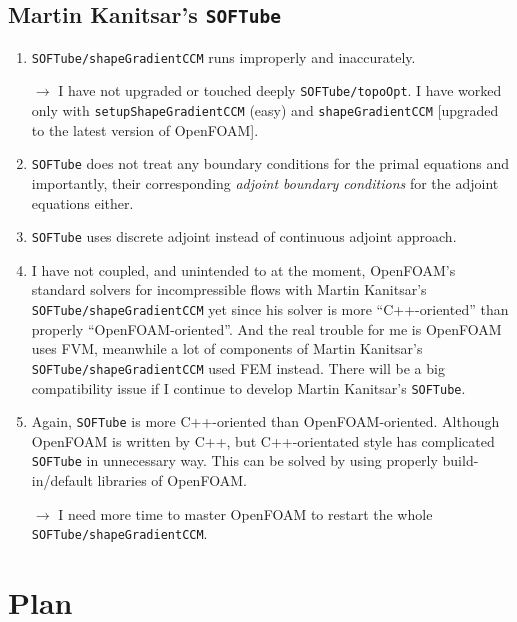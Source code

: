 \documentclass[onsided]{book}
\numberwithin{equation}{section}
\begin{document}
\section{Martin Kanitsar's \texttt{SOFTube}}
\begin{enumerate}
    \item \texttt{SOFTube/shapeGradientCCM} runs improperly and inaccurately.
    
    $\to$ I have not upgraded or touched deeply \texttt{SOFTube/topoOpt}. I have worked only with \texttt{setupShapeGradientCCM} (easy) and \texttt{shapeGradientCCM} [upgraded to the latest version of OpenFOAM].
    \item \texttt{SOFTube} does not treat any boundary conditions for the primal equations and importantly, their corresponding \textit{adjoint boundary conditions} for the adjoint equations either.
    \item \texttt{SOFTube} uses discrete adjoint instead of continuous adjoint approach.
    \item I have not coupled, and unintended to at the moment, OpenFOAM's standard solvers for incompressible flows with Martin Kanitsar's \texttt{SOFTube/shapeGradientCCM} yet since his solver is more ``C++-oriented'' than properly ``OpenFOAM-oriented''. And the real trouble for me is OpenFOAM uses FVM, meanwhile a lot of components of Martin Kanitsar's \texttt{SOFTube/shapeGradientCCM} used FEM instead. There will be a big compatibility issue if I continue to develop Martin Kanitsar's \texttt{SOFTube}.
    \item Again, \texttt{SOFTube} is more C++-oriented than OpenFOAM-oriented. Although OpenFOAM is written by C++, but C++-orientated style has complicated \texttt{SOFTube} in unnecessary way. This can be solved by using properly build-in/default libraries of OpenFOAM.
    
    $\to$ I need more time to master OpenFOAM to restart the whole \texttt{SOFTube/shapeGradientCCM}.    
\end{enumerate}


\chapter{Plan}
\end{document}
